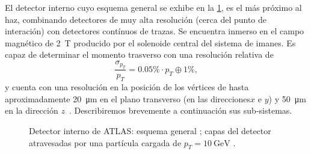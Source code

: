 El detector interno cuyo esquema general se exhibe en la \cref{fig:ch2:atlas_ID}, es el más próximo al haz, combinando detectores de muy alta resolución (cerca del punto de interación) con detectores contínuos de trazas. Se encuentra inmerso en el campo magnético de \SI{2}{\tesla} producido por el solenoide central del sistema de imanes. Es capaz de determinar el momento trasverso con una resolución relativa de
\[ \frac{\sigma_{p_T}}{p_T} = 0.05\% \cdot p_T \oplus 1\%, \]
y cuenta con una resolución en la posición de los vértices de hasta aproximadamente \SI{20}{\micro\meter} en el plano transverso (en las direcciones$x$ e $y$) y \SI{50}{\micro\meter} en la dirección $z$~\cite[-2em][]{ATL-PHYS-PUB-2015-026}. Describiremos brevemente a continuación sus sub-sistemas.

\begin{figure}[t]
    \centering
    \caption{Detector interno de ATLAS: esquema general ; capas del detector atravesadas por una partícula cargada de $p_T = \SI{10}{\GeV}$ .}
    \label{fig:ch2:atlas_ID}
\end{figure}

%

